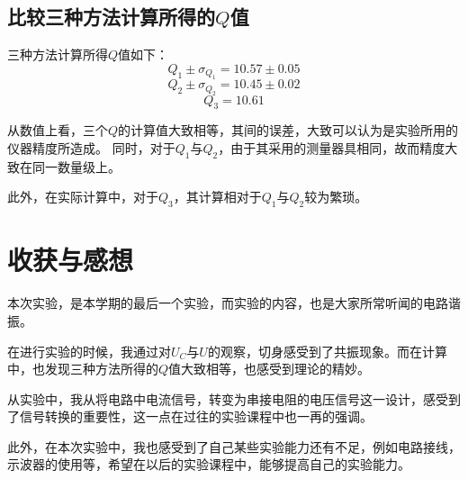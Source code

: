 \documentclass{ctexart}
\begin{document}
\subsection{比较三种方法计算所得的$Q$值}
三种方法计算所得$Q$值如下：
$$Q_1\pm\sigma_{Q_1}=10.57\pm0.05$$
$$Q_2\pm\sigma_{Q_2}=10.45\pm0.02$$
$$Q_3=10.61$$

从数值上看，三个$Q$的计算值大致相等，其间的误差，大致可以认为是实验所用的仪器精度所造成。
同时，对于$Q_1$与$Q_2$，由于其采用的测量器具相同，故而精度大致在同一数量级上。

此外，在实际计算中，对于$Q_3$，其计算相对于$Q_1$与$Q_2$较为繁琐。
      \section{收获与感想}
      本次实验，是本学期的最后一个实验，而实验的内容，也是大家所常听闻的电路谐振。

      在进行实验的时候，我通过对$U_C$与$U$的观察，切身感受到了共振现象。而在计算中，也发现三种方法所得的$Q$值大致相等，也感受到理论的精妙。

      从实验中，我从将电路中电流信号，转变为串接电阻的电压信号这一设计，感受到了信号转换的重要性，这一点在过往的实验课程中也一再的强调。

      此外，在本次实验中，我也感受到了自己某些实验能力还有不足，例如电路接线，示波器的使用等，希望在以后的实验课程中，能够提高自己的实验能力。
\end{document}
